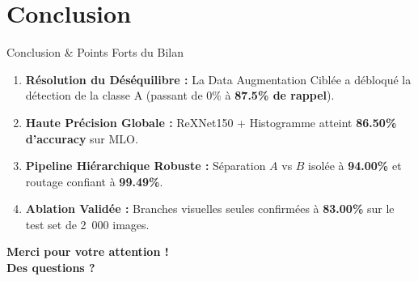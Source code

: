 \documentclass[10pt, compress]{beamer}
\begin{document}
\section{Conclusion}

\begin{frame}{Conclusion \& Points Forts du Bilan}
    \begin{enumerate}
        \item \textbf{Résolution du Déséquilibre :} La Data Augmentation Ciblée a débloqué la détection de la classe A (passant de $0\%$ à \textbf{87.5\% de rappel}).
        \item \textbf{Haute Précision Globale :} ReXNet150 + Histogramme atteint \textbf{86.50\% d'accuracy} sur MLO.
        \item \textbf{Pipeline Hiérarchique Robuste :} Séparation $A$ vs $B$ isolée à \textbf{94.00\%} et routage confiant à \textbf{99.49\%}.
        \item \textbf{Ablation Validée :} Branches visuelles seules confirmées à \textbf{83.00\%} sur le test set de 2~000 images.
    \end{enumerate}

    \vspace{0.5cm}
    \centering
    \Huge \bf \color{umonsRed} Merci pour votre attention !\\
    \large Des questions ?
\end{frame}
\end{document}
